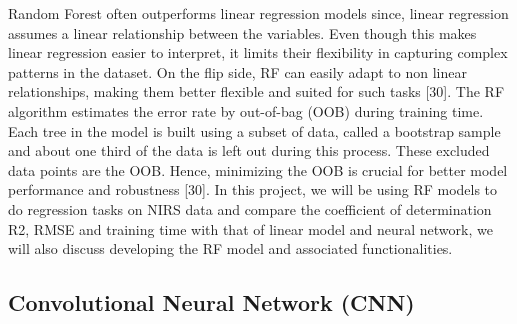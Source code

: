 \documentclass[12pt,a4paper]{report}
\begin{document}
Random Forest often outperforms linear regression models since, linear regression assumes a linear relationship between the variables. Even though this makes linear regression easier to interpret, it limits their flexibility in capturing complex patterns in the dataset. 
On the flip side, RF can easily adapt to non linear relationships, making them better flexible and suited for such tasks [30]. The RF algorithm estimates the error rate by out-of-bag (OOB) during training time. Each tree in the model is built using a subset of data, called a 
bootstrap sample and about one third of the data is left out during this process. These excluded data points are the OOB. Hence, minimizing the OOB is crucial for better model performance and robustness [30]. 
In this project, we will be using RF models to do regression tasks on NIRS data and compare the coefficient of determination R2, RMSE and training time with that of linear model and neural network, we will also discuss developing the RF model and associated functionalities. \\



\subsection{Convolutional Neural Network (CNN)}
\end{document}
